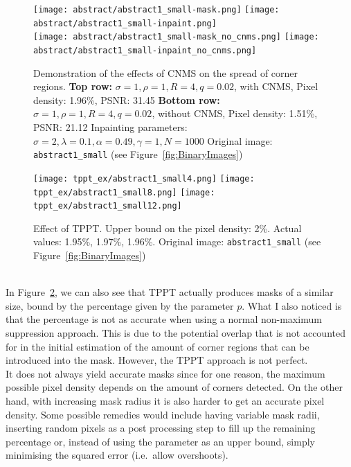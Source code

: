 \begin{figure}[h]
    \centering
    \texttt{[image: abstract/abstract1\_small-mask.png]}\hspace{0.2cm}
    \texttt{[image: abstract/abstract1\_small-inpaint.png]}\\
    \vspace*{0.2cm}
    \texttt{[image: abstract/abstract1\_small-mask\_no\_cnms.png]}\hspace{0.2cm}
    \texttt{[image: abstract/abstract1\_small-inpaint\_no\_cnms.png]}\\
    \caption{Demonstration of the effects of CNMS on the spread of corner regions.
\textbf{Top row:} $\sigma=1,\rho=1,R=4,q=0.02$, with CNMS, Pixel density: 1.96\%, PSNR\@:
31.45
\textbf{Bottom row:} $\sigma=1,\rho=1,R=4,q=0.02$, without CNMS, Pixel density:
1.51\%, PSNR\@: 21.12
Inpainting parameters: $\sigma=2,\lambda=0.1,\alpha=0.49,\gamma=1,N=1000$
Original image: \texttt{abstract1\_small} (see Figure~\ref{fig:BinaryImages})}\label{fig:AbstractCNMSExamples}
\end{figure}
\begin{figure}[ht]
    \centering
    \texttt{[image: tppt\_ex/abstract1\_small4.png]}
    \texttt{[image: tppt\_ex/abstract1\_small8.png]}
    \texttt{[image: tppt\_ex/abstract1\_small12.png]}
    \caption{Effect of TPPT\@. Upper bound on the pixel density: 2\%. Actual values:
        1.95\%, 1.97\%, 1.96\%. Original image: \texttt{abstract1\_small} (see
    Figure~\ref{fig:BinaryImages})}\label{fig:TPPTEx}
\end{figure}
\\\noindent In Figure~\ref{fig:TPPTEx}, we can also see that TPPT actually produces masks of a
similar size, bound by the percentage given by the parameter $p$. What I also noticed is that the
percentage is not as accurate when using a normal non-maximum suppression approach. This is due to
the potential overlap that is not accounted for in the initial estimation of the amount of corner
regions that can be introduced into the mask.
However, the TPPT approach is not perfect.\\
It does not always yield accurate masks since for one
reason, the maximum possible pixel density depends on the amount of corners detected. On the other
hand, with increasing mask radius it is also harder to get an accurate pixel density. Some possible
remedies would include having variable mask radii, inserting random pixels as a post processing
step to fill up the
remaining percentage or, instead of using the parameter as an upper bound, simply minimising the
squared error (i.e.\ allow overshoots).
\newpage\noindent
